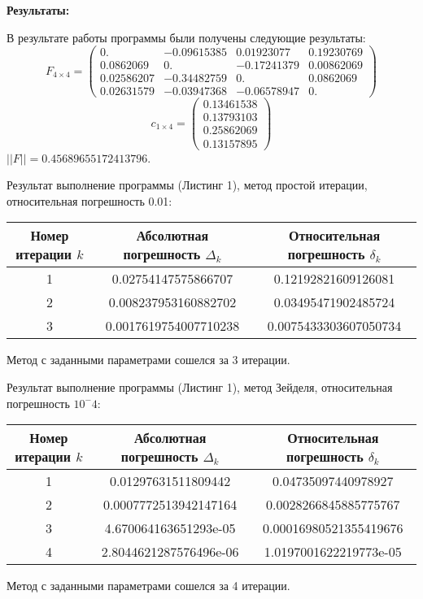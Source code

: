 \documentclass [12pt]{article}
\begin{document}
\textbf{Результаты:}

В результате работы программы были получены следующие результаты: 
\[
    F_{4\times 4} = 
    \begin{pmatrix}
      0. & -0.09615385 & 0.01923077 & 0.19230769\\
      0.0862069 & 0. & -0.17241379 & 0.00862069\\
      0.02586207 & -0.34482759 & 0. & 0.0862069\\
      0.02631579 & -0.03947368 & -0.06578947 & 0.
    \end{pmatrix}
\]
\[
  c_{1\times 4} = 
  \begin{pmatrix}
    0.13461538 \\
    0.13793103 \\
    0.25862069 \\
    0.13157895 
  \end{pmatrix}
\]
$ ||F|| = 0.45689655172413796$.

Результат выполнение программы (Листинг 1), метод простой итерации, относительная погрешность 0.01:
\begin{table}[H]
\begin{center}
\begin{tabular}{|c|c|c|}
\hline
Номер итерации $k$ & Абсолютная погрешность $\Delta_{k}$ & Относительная погрешность $\delta_{k}$ \\ \hline
1 & 0.02754147575866707 & 0.12192821609126081  \\ \hline
2 & 0.008237953160882702 & 0.03495471902485724  \\ \hline
3 & 0.0017619754007710238 & 0.0075433303607050734  \\ \hline
\end{tabular}
\end{center}
\end{table} 
Метод с заданными параметрами сошелся за 3 итерации.

Результат выполнение программы (Листинг 1), метод Зейделя, относительная погрешность $10^-4$:
\begin{table}[H]
\begin{center}
\begin{tabular}{|c|c|c|}
\hline
Номер итерации $k$ & Абсолютная погрешность $\Delta_{k}$ & Относительная погрешность $\delta_{k}$ \\ \hline
1 & 0.01297631511809442 & 0.04735097440978927  \\ \hline
2 & 0.0007772513942147164 & 0.0028266845885775767  \\ \hline
3 & 4.670064163651293e-05 & 0.00016980521355419676  \\ \hline
4 & 2.8044621287576496e-06 & 1.0197001622219773e-05  \\ \hline
\end{tabular}
\end{center}
\end{table}
Метод с заданными параметрами сошелся за 4 итерации.
\end{document}
